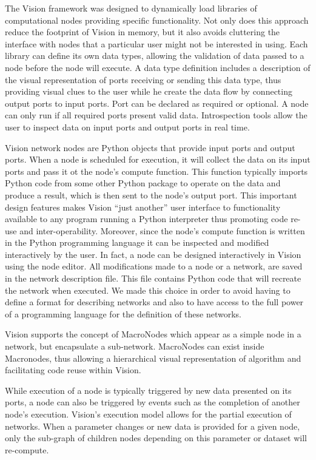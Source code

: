 \documentclass[conference]{IEEEtran}
\begin{document}
The Vision framework was designed to dynamically load libraries of
computational nodes providing specific functionality. Not only does this
approach reduce the footprint of Vision in memory, but it also avoids
cluttering the interface with nodes that a particular user might not be
interested in using. Each library can define its own data types, allowing
the validation of data passed to a node before the node will execute. A
data type definition includes a description of the visual representation of
ports receiving or sending this data type, thus providing visual clues to
the user while he create the data flow by connecting output ports to input
ports. Port can be declared as required or optional. A node can only run if
all required ports present valid data. Introspection tools allow the user
to inspect data on input ports and output ports in real time.

Vision network nodes are Python objects that provide input ports and output
ports. When a node is scheduled for execution, it will collect the data on
its input ports and pass it ot the node’s compute function. This function
typically imports Python code from some other Python package to operate on
the data and produce a result, which is then sent to the node’s output
port. This important design features makes Vision “just another” user
interface to functionality available to any program running a Python
interpreter thus promoting code re-use and inter-operability. Moreover,
since the node’s compute function is written in the Python programming
language it can be inspected and modified interactively by the user.  In
fact, a node can be designed interactively in Vision using the node editor.
All modifications made to a node or a network, are saved in the network
description file. This file contains Python code that will recreate the
network when executed. We made this choice in order to avoid having to
define a format for describing networks and also to have access to the full
power of a programming language for the definition of these networks.

Vision supports the concept of MacroNodes which appear as a simple node in
a network, but encapsulate a sub-network. MacroNodes can exist inside
Macronodes, thus allowing a hierarchical visual representation of algorithm
and facilitating code reuse within Vision.

While execution of a node is typically triggered by new data presented on
its ports, a node can also be triggered by events such as the completion of
another node’s execution. Vision’s execution model allows for the partial
execution of networks. When a parameter changes or new data is provided for
a given node, only the sub-graph of children nodes depending on this
parameter or dataset will re-compute.
\end{document}
